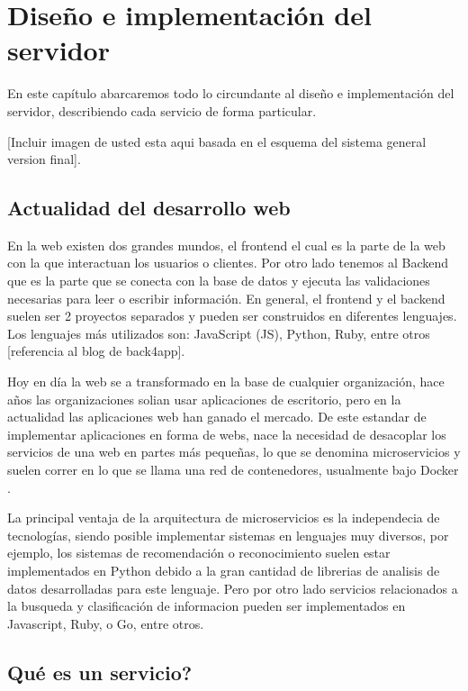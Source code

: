 \chapter{Diseño e implementación del servidor}

En este capítulo abarcaremos todo lo circundante al diseño e implementación del servidor, describiendo cada servicio de forma particular.

    [Incluir imagen de usted esta aqui basada en el esquema del sistema general version final].

\section{Actualidad del desarrollo web}

En la web existen dos grandes mundos, el frontend el cual es la parte de la web con la que interactuan los usuarios o clientes. Por otro lado tenemos al Backend que es la parte que se conecta con la base de datos y ejecuta las validaciones necesarias para leer o escribir información. En general, el frontend y el backend suelen ser 2 proyectos separados y pueden ser construidos en diferentes lenguajes. Los lenguajes más utilizados son: JavaScript (JS), Python, Ruby, entre otros [referencia al blog de back4app].

Hoy en día la web se a transformado en la base de cualquier organización, hace años las organizaciones solian usar aplicaciones de escritorio, pero en la actualidad las aplicaciones web han ganado el mercado.
De este estandar de implementar aplicaciones en forma de webs, nace la necesidad de desacoplar los servicios de una web en partes más pequeñas, lo que se denomina microservicios y suelen correr en lo que se llama una red de contenedores, usualmente bajo Docker \cite{noauthor_documentacion_2023}.

La principal ventaja de la arquitectura de microservicios es la independecia de tecnologías, siendo posible implementar sistemas en lenguajes muy diversos, por ejemplo, los sistemas de recomendación o reconocimiento suelen estar implementados en Python debido a la gran cantidad de librerias de analisis de datos desarrolladas para este lenguaje. Pero por otro lado servicios relacionados a la busqueda y clasificación de informacion pueden ser implementados en Javascript, Ruby, o Go, entre otros.

\section{Qué es un servicio?}

